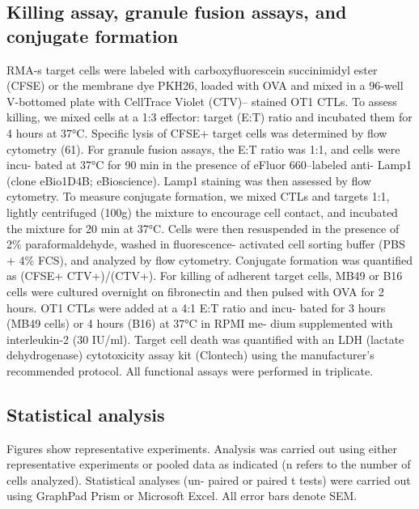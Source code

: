 \subsection{Killing assay, granule fusion assays, and conjugate formation}
RMA-s target cells were labeled with carboxyfluorescein succinimidyl ester (CFSE) or the membrane dye PKH26, loaded with OVA and mixed in a 96-well V-bottomed plate with CellTrace Violet (CTV)– stained OT1 CTLs. To assess killing, we mixed cells at a 1:3 effector: target (E:T) ratio and incubated them for 4 hours at 37°C. Specific lysis of CFSE+ target cells was determined by flow cytometry (61).
For granule fusion assays, the E:T ratio was 1:1, and cells were incu- bated at 37°C for 90 min in the presence of eFluor 660–labeled anti- Lamp1 (clone eBio1D4B; eBioscience). Lamp1 staining was then assessed by flow cytometry. To measure conjugate formation, we mixed CTLs and targets 1:1, lightly centrifuged (100g) the mixture to encourage cell contact, and incubated the mixture for 20 min at 37°C. Cells were then resuspended in the presence of 2\% paraformaldehyde, washed in fluorescence- activated cell sorting buffer (PBS + 4\% FCS), and analyzed by flow cytometry. Conjugate formation was quantified as (CFSE+ CTV+)/(CTV+). For killing of adherent target cells, MB49 or B16 cells were cultured overnight on fibronectin and then pulsed with OVA for 2 hours. OT1 CTLs were added at a 4:1 E:T ratio and incu- bated for 3 hours (MB49 cells) or 4 hours (B16) at 37°C in RPMI me- dium supplemented with interleukin-2 (30 IU/ml). Target cell death was quantified with an LDH (lactate dehydrogenase) cytotoxicity assay kit (Clontech) using the manufacturer’s recommended protocol. All functional assays were performed in triplicate.

\subsection{Statistical analysis}
Figures show representative experiments. Analysis was carried out using either representative experiments or pooled data as indicated (n refers to the number of cells analyzed). Statistical analyses (un- paired or paired t tests) were carried out using GraphPad Prism or Microsoft Excel. All error bars denote SEM.

